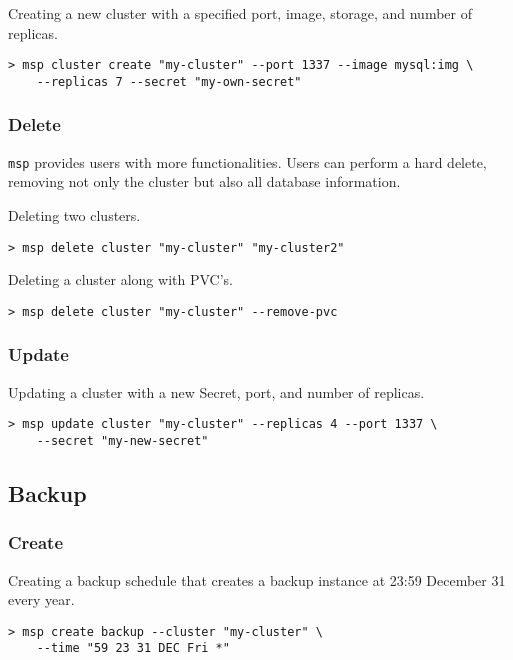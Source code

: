 \noindent Creating a new cluster with a specified port, image, storage, and number of replicas.

\begin{lstlisting}
> msp cluster create "my-cluster" --port 1337 --image mysql:img \
	--replicas 7 --secret "my-own-secret"
\end{lstlisting}

\subsubsection*{Delete}

\texttt{msp} provides users with more functionalities. Users can perform a hard
delete, removing not only the cluster but also all database information.

\noindent Deleting two clusters.

\begin{lstlisting}
> msp delete cluster "my-cluster" "my-cluster2"
\end{lstlisting}

\noindent Deleting a cluster along with PVC's.

\begin{lstlisting}
> msp delete cluster "my-cluster" --remove-pvc
\end{lstlisting}

\subsubsection*{Update}
\noindent Updating a cluster with a new Secret, port, and number of replicas.

\begin{lstlisting}
> msp update cluster "my-cluster" --replicas 4 --port 1337 \
	--secret "my-new-secret"
\end{lstlisting}

\subsection{Backup}

\subsubsection*{Create}
\noindent Creating a backup schedule that creates a backup instance at 23:59 December 31 every year.

\begin{lstlisting}
> msp create backup --cluster "my-cluster" \
	--time "59 23 31 DEC Fri *"
\end{lstlisting}

